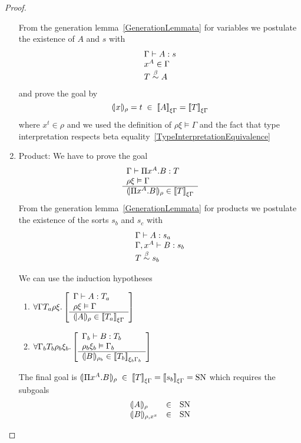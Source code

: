\begin{theorem}
\begin{proof}
\begin{enumerate}
            From the generation lemma~\ref{GenerationLemmata} for variables
            we postulate the existence of $A$ and $s$ with
            $$
            \begin{array}{l}
                \Gamma \vdash A : s
                \\
                x^A \in \Gamma
                \\
                T \stackrel{\beta}{\sim} A
            \end{array}
            $$
            and prove the goal by
            $$
                {(\!|x|\!)_{\rho}} = t
                \;\in\;
                {{[\![} A{]\!]}}_{\xi\Gamma}
                =
                {{[\![} T{]\!]}}_{\xi\Gamma}
            $$
            where $x^t \in \rho$ and we used the definition of $\rho\xi \vDash
                \Gamma$ and the fact that type interpretation respects beta
                equality~\ref{TypeInterpretationEquivalence}


        \item Product: We have to prove the goal
            $$
                \begin{array}{l}  \Gamma \vdash \Pi x^A.B : T \\ \rho \xi \vDash \Gamma  \\ \hline  {(\!|\Pi x^A.B|\!)_{\rho}} \in {{[\![}T{]\!]}}_{\xi\Gamma} \end{array}
            $$
            From the generation lemma~\ref{GenerationLemmata} for products
            we postulate the existence of the sorts $s_b$ and $s_c$ with
            $$
            \begin{array}{l}
                \Gamma \vdash A: s_a
                \\
                \Gamma,x^A \vdash B: s_b
                \\
                T \stackrel{\beta}{\sim} s_b
            \end{array}
            $$

            We can use the induction hypotheses
            \begin{enumerate}
            \item
                $\forall \Gamma T_a \rho \xi. \left[ \begin{array}{l}  \Gamma \vdash A : T_a \\ \rho \xi \vDash \Gamma  \\ \hline  {(\!|A|\!)_{\rho}} \in {{[\![}T_a{]\!]}}_{\xi\Gamma} \end{array} \right]$

            \item
                $\forall \Gamma_b T_b \rho_b \xi_b. \left[ \begin{array}{l}  \Gamma_b \vdash B : T_b \\ \rho_b \xi_b \vDash \Gamma_b  \\ \hline  {(\!|B|\!)_{\rho_b}} \in {{[\![}T_b{]\!]}}_{\xi_b\Gamma_b} \end{array} \right]$
            \end{enumerate}

            The final goal is
            ${(\!|\Pi x^A.B|\!)_{\rho}}
            \;\in\;
            {{[\![} T{]\!]}}_{\xi\Gamma}
            = {{[\![} s_b{]\!]}}_{\xi\Gamma}
            =\text{SN}$
            which requires the subgoals
            $$
            \begin{array}{lll}
                {(\!|A|\!)_{\rho}} &\in& \text{SN}
                \\
                {(\!|B|\!)_{\rho,x^x}} &\in& \text{SN}
            \end{array}
            $$


\end{enumerate}
\end{proof}
\end{theorem}
